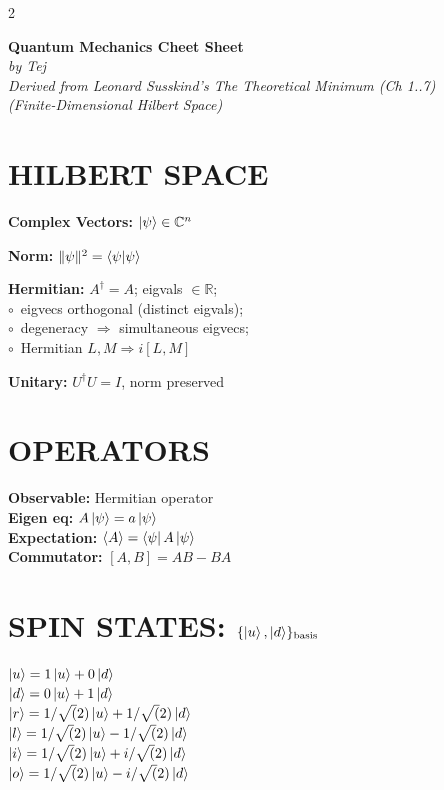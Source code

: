 \documentclass[10pt,a4paper]{article}
\begin{document}
\footnotesize

\begin{multicols}{2}

\begin{center}
\textbf{\large Quantum Mechanics Cheet Sheet}\\
\textit{by Tej}\\

\textit{Derived from Leonard Susskind's \textit{The Theoretical Minimum (Ch 1..7)}}\\
\textit{(Finite-Dimensional Hilbert Space)}\\[-0.6em]
\end{center}

\section{HILBERT SPACE}

\textbf{Complex Vectors:} $\ket{\psi} \in \mathbb{C}^n$ 

\textbf{Norm:} $\|\psi\|^2 = \braket{\psi}$ 

\textbf{Hermitian:} $A^\dagger = A$; eigvals $\in \mathbb{R}$; \\
$\circ\,$ eigvecs orthogonal (distinct eigvals); \\
$\circ\, $ degeneracy $\Rightarrow$ simultaneous eigvecs; \\
$\circ\, $ Hermitian $L,M \Rightarrow i[L,M]$

\textbf{Unitary:} $U^\dagger U = I$, norm preserved\\

\section{OPERATORS}

\textbf{Observable:} Hermitian operator\\
\textbf{Eigen eq:} $A\ket{\psi} = a\ket{\psi}$\\
\textbf{Expectation:} $\langle A \rangle = \bra{\psi}A\ket{\psi}$\\
\textbf{Commutator:} $[A,B] = AB - BA$\\

\section{SPIN STATES: $\{\ket{u}, \ket{d}\}_{\text{basis}}$}
$\ket{u} = 1\ket{u} + 0\ket{d}$\\
$\ket{d} = 0\ket{u} + 1\ket{d}$\\
$\ket{r} = 1/\sqrt(2) \ket{u} + 1/\sqrt(2) \ket{d}$\\
$\ket{l} = 1/\sqrt(2) \ket{u} - 1/\sqrt(2) \ket{d}$\\
$\ket{i} = 1/\sqrt(2) \ket{u} + i/\sqrt(2) \ket{d}$\\
$\ket{o} = 1/\sqrt(2) \ket{u} - i/\sqrt(2) \ket{d}$\\


\end{multicols}
\end{document}
